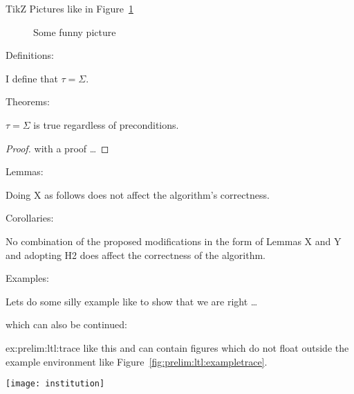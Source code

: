TikZ Pictures like in Figure~\ref{fig:def:prelim:ltl:kl-loop}
\begin{figure}
  \centering
  \caption{Some funny picture}
  \label{fig:def:prelim:ltl:kl-loop}
\end{figure}

Definitions:
\begin{definition}[Trace]\label{def:prelim:ltl:trace}
  I define that  $\tau = \Sigma$.
\end{definition}

Theorems:
\begin{theorem} \label{thm:enc:enc:basic}
	$\tau = \Sigma$ is true regardless of preconditions. 
\end{theorem}
\begin{proof}
with a proof \ldots 
\end{proof}

Lemmas:
\begin{lemma}
Doing X as follows does not affect the algorithm's correctness. 
\end{lemma}

Corollaries:
\begin{corollary} 
	No combination of the proposed modifications in the form of Lemmas X and Y and adopting H2 does affect the correctness of the algorithm.
\end{corollary}


Examples:

\begin{example} \label{ex:prelim:ltl:trace}
Lets do some silly example like to show that we are right \ldots
\end{example}

which can also be continued:

\begin{examplecont}{ex:prelim:ltl:trace}
	 like this and can contain figures which do not float outside the example 
	 environment like Figure~\ref{fig:prelim:ltl:exampletrace}.

	 \begin{fakefigure}
	  \vspace*{-1em}
		\centering
		\captionsetup{type=figure}
		\texttt{[image: institution]}
		\label{fig:prelim:ltl:exampletrace}
	\end{fakefigure}
\end{examplecont}

